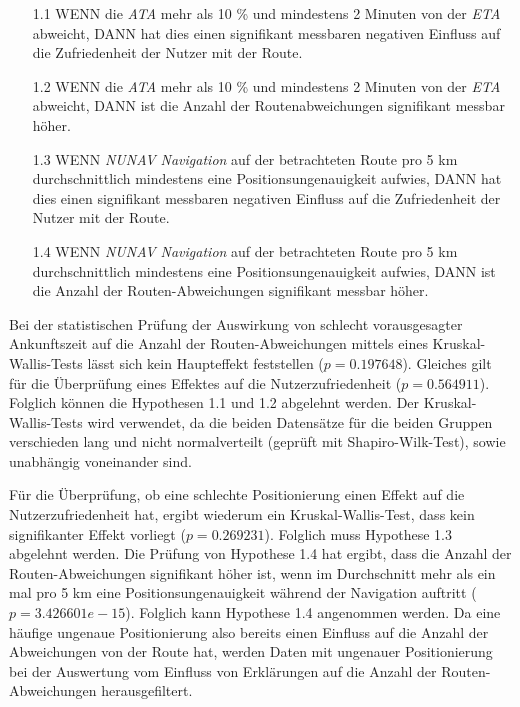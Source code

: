\begin{enumerate}
    \item[1.1] WENN die \textit{ATA} mehr als 10 \% und mindestens 2 Minuten von der \textit{ETA} abweicht, DANN hat dies einen signifikant messbaren negativen Einfluss auf die Zufriedenheit der Nutzer mit der Route.
    \item[1.2] WENN die \textit{ATA} mehr als 10 \% und mindestens 2 Minuten von der \textit{ETA} abweicht, DANN ist die Anzahl der Routenabweichungen signifikant messbar höher.
    \item[1.3] WENN \textit{NUNAV Navigation} auf der betrachteten Route pro 5 km durchschnittlich mindestens eine Positionsungenauigkeit aufwies, DANN hat dies einen signifikant messbaren negativen Einfluss auf die Zufriedenheit der Nutzer mit der Route.
    \item[1.4] WENN \textit{NUNAV Navigation} auf der betrachteten Route pro 5 km durchschnittlich mindestens eine Positionsungenauigkeit aufwies, DANN ist die Anzahl der Routen-Abweichungen signifikant messbar höher.
\end{enumerate}

Bei der statistischen Prüfung der Auswirkung von schlecht vorausgesagter Ankunftszeit auf die Anzahl der Routen-Abweichungen mittels eines Kruskal-Wallis-Tests lässt sich kein Haupteffekt feststellen ($ p = 0.197648 $). Gleiches gilt für die Überprüfung eines Effektes auf die Nutzerzufriedenheit ($ p = 0.564911 $). Folglich können die Hypothesen 1.1 und 1.2 abgelehnt werden. Der Kruskal-Wallis-Tests wird verwendet, da die beiden Datensätze für die beiden Gruppen verschieden lang und nicht normalverteilt (geprüft mit Shapiro-Wilk-Test), sowie unabhängig voneinander sind.

Für die Überprüfung, ob eine schlechte Positionierung einen Effekt auf die Nutzerzufriedenheit hat, ergibt wiederum ein Kruskal-Wallis-Test, dass kein signifikanter Effekt vorliegt ($ p = 0.269231 $). Folglich muss Hypothese 1.3 abgelehnt werden. Die Prüfung von Hypothese 1.4 hat ergibt, dass die Anzahl der Routen-Abweichungen signifikant höher ist, wenn im Durchschnitt mehr als ein mal pro 5 km eine Positionsungenauigkeit während der Navigation auftritt ($ p = 3.426601e-15 $). Folglich kann Hypothese 1.4 angenommen werden. Da eine häufige ungenaue Positionierung also bereits einen Einfluss auf die Anzahl der Abweichungen von der Route hat, werden Daten mit ungenauer Positionierung bei der Auswertung vom Einfluss von Erklärungen auf die Anzahl der Routen-Abweichungen herausgefiltert.

